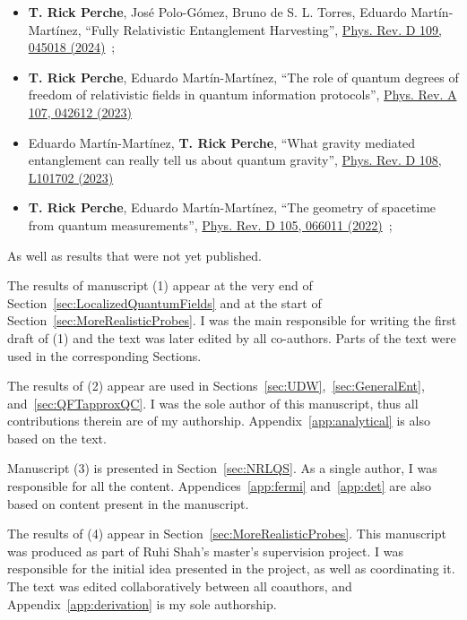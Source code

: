 \begin{itemize}
    \item[(7)] \textbf{T. Rick Perche}, José Polo-Gómez, Bruno de S. L. Torres, Eduardo Martín-Martínez, ``Fully Relativistic Entanglement Harvesting'', \href{https://doi.org/10.1103/PhysRevD.109.045018}{Phys. Rev. D 109, 045018 (2024)}~\cite{FullHarvesting};
    \item[(8)] \textbf{T. Rick Perche}, Eduardo Martín-Martínez, ``The role of quantum degrees of freedom of relativistic fields in quantum information protocols'', \href{https://doi.org/10.1103/PhysRevA.107.042612}{Phys. Rev. A 107, 042612 (2023)}~\cite{quantClass}
    \item[(9)] Eduardo Martín-Martínez, \textbf{T. Rick Perche}, ``What gravity mediated entanglement can really tell us about quantum gravity'', \href{https://doi.org/10.1103/PhysRevD.108.L101702}{Phys. Rev. D 108, L101702 (2023)}~\cite{ourBMV}
    \item[(10)] \textbf{T. Rick Perche}, Eduardo Martín-Martínez, ``The geometry of spacetime from quantum measurements'', \href{https://doi.org/10.1103/PhysRevD.105.066011}{Phys. Rev. D 105, 066011 (2022)}~\cite{geometry};
\end{itemize}
\noindent As well as results that were not yet published.

The results of manuscript (1) appear at the very end of Section~\ref{sec:LocalizedQuantumFields} and at the start of Section~\ref{sec:MoreRealisticProbes}. I was the main responsible for writing the first draft of (1) and the text was later edited by all co-authors. Parts of the text were used in the corresponding Sections.

The results of (2) appear are used in Sections~\ref{sec:UDW},~\ref{sec:GeneralEnt}, and~\ref{sec:QFTapproxQC}. I was the sole author of this manuscript, thus all contributions therein are of my authorship. Appendix~\ref{app:analytical} is also based on the text.

Manuscript (3) is presented in Section~\ref{sec:NRLQS}. As a single author, I was responsible for all the content. Appendices~\ref{app:fermi} and~\ref{app:det} are also based on content present in the manuscript.

The results of (4) appear in Section~\ref{sec:MoreRealisticProbes}. This manuscript was produced as part of Ruhi Shah's master's supervision project. I was responsible for the initial idea presented in the project, as well as coordinating it. The text was edited collaboratively between all coauthors, and Appendix~\ref{app:derivation} is my sole authorship.


